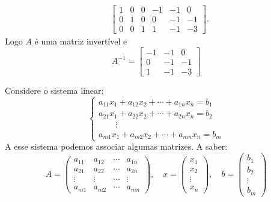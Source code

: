 \begin{exemplo}
\begin{solucao}
\begin{align*}
            &\left[
                \begin{array}{ccc|ccc}
                    1 & 0 & 0 & -1 & -1 & 0\\
                    0 & 1 & 0 & 0 & -1 & -1\\
                    0 & 0 & 1 & 1 & -1 & -3
                \end{array}
            \right].
        \end{align*}
        Logo $A$ é uma matriz invertível e
        \[
            A^{-1} = \begin{bmatrix}
                    -1 & -1 & 0\\
                    0 & -1 & -1\\
                    1 & -1 & -3
                \end{bmatrix}
        \]
    \end{solucao}
\end{exemplo}
Considere o sistema linear:
\begin{equation}
\begin{cases}
        a_{11}x_1 + a_{12}x_2 + \cdots + a_{1n}x_n = b_1\\
        a_{21}x_1 + a_{22}x_2 + \cdots + a_{2n}x_n = b_2\\
        \qquad \vdots\\
        a_{m1}x_1 + a_{m2}x_2 + \cdots + a_{mn}x_n = b_m
    \end{cases}
\end{equation}
A esse sistema podemos associar algumas matrizes. A saber:
\[
    A = \begin{pmatrix}
        a_{11} & a_{12} & \cdots & a_{1n}\\
        a_{21} & a_{22} & \cdots & a_{2n}\\
        \vdots & \vdots & \cdots & \vdots\\
        a_{m1} & a_{m2} & \cdots & a_{mn}
    \end{pmatrix}, \quad
    x = \begin{pmatrix}
        x_1\\
        x_2\\
        \vdots\\
        x_n
    \end{pmatrix},\quad
    b = \begin{pmatrix}
        b_1\\
        b_2\\
        \vdots\\
        b_m
    \end{pmatrix}
\]

